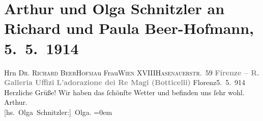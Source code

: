 

         
         \renewcommand{\erwaehntePersonen}{Personen: Richard Beer-Hofmann, Paula Beer-Hofmann, Sandro Botticelli, Olga Schnitzler}
         \renewcommand{\erwaehnteOrte}{Orte: Florenz, Hasenauerstraße, Santa Maria Novella, Uffizien, Wien, XVIII., Währing}
         \renewcommand{\erwaehnteWerke}{Werke: Die Anbetung der heiligen drei Könige}
               \section[Arthur und Olga Schnitzler an Richard und Paula Beer-Hofmann, 5. 5. 1914]{ Arthur und Olga Schnitzler an Richard und Paula Beer-Hofmann,
               5. 5. 1914}\nopagebreak{}\rehead{ }\begin{ledgroupsized}[t]{13cm}\normalsize\beginnumbering \toendnotes[C]{\smallbreak\pagebreak[2]} 
\pstart{}{\pb}Hrn \textsc{Dr. Richard BeerHofma{\geminationn}}\pend{}\pstart{}u Frau\pend{}\pstart{}\textsc{Wien XVIII}\pend{}\pstart{}\textsc{Hasenauerstr. 59}\pend{}{\bigskip}\pstart
           \noindent{}\centering{}{\pb}\textcolor{gray}{\textbf{Firenze – R. Galleria Uffizi}}\pend
           \pstart
           \noindent{}\centering{}\textcolor{gray}{\textbf{L’adorazione dei Re Magi (Botticelli)}}\pend
           \pstart
           \centering{}{\pb}Florenz5. 5. 914\pend
           \pstart
           Herzliche Grüße!\pend
           \pstart
           Wir haben das ſchönſte Wetter und befinden uns ſehr wohl.\pend
           \pstart
           \spacefill\mbox{Arthur.}{\\[\baselineskip]}\spacefill\mbox{{[}hs. Olga Schnitzler:{]} Olga.}\pend
           \leftskip=0em{}
         
         \endnumbering{}\end{ledgroupsized}  \newcommand{\dateiname}{L02177}\newcommand{\titel}{Arthur und Olga Schnitzler an Richard und Paula Beer-Hofmann, 5. 5. 1914}\newcommand{\editorInnen}{Martin Anton Müller und Gerd-Hermann Susen}
      